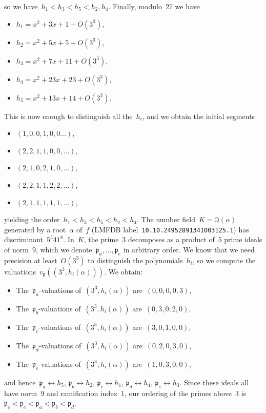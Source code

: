 \documentclass{article}
\def\Q{{\mathbb Q}}
\def\p{{\mathfrak p}}
\begin{document}
so we have~$h_1<h_3<h_5<h_2,h_4$. Finally, modulo~$27$ we have
\begin{itemize}
  \item $h_1 = x^2 + 3x + 1 + O(3^3)$,
  \item $h_2 = x^2 + 5x + 5 + O(3^3)$,
  \item $h_3 = x^2 + 7x + 11 + O(3^3)$,
  \item $h_4 = x^2 + 23x + 23 + O(3^3)$,
  \item $h_5 = x^2 + 13x + 14 + O(3^3)$.
\end{itemize}
This is now enough to distinguish all the~$h_i$, and we obtain the initial segments
\begin{itemize}
  \item $(1,0,0,1,0,0\dots)$,
  \item $(2,2,1,1,0,0,\dots)$,
  \item $(2,1,0,2,1,0,\dots)$,
  \item $(2,2,1,1,2,2,\dots)$,
  \item $(2,1,1,1,1,1,\dots)$,
\end{itemize}
yielding the order~$h_1 < h_3 < h_5 < h_2 < h_4$. The number field~$K =
\Q(\alpha)$ generated by a root~$\alpha$ of~$f$ (LMFDB
label~\texttt{10.10.24952891341003125.1}) has discriminant~$5^5 41^8$.
In~$K$, the prime~$3$ decomposes as a product of~$5$ prime ideals of norm~$9$,
which we denote~$\p_a, \dots, \p_e$ in arbitrary order. We know that we need
precision at least~$O(3^3)$ to distinguish the polynomials~$h_i$, so we compute
the valuations~$v_\p((3^3,h_i(\alpha)))$. We obtain:
\begin{itemize}
  \item The~$\p_a$-valuations of~$(3^3,h_i(\alpha))$ are~$(0,0,0,0,3)$,
  \item The~$\p_b$-valuations of~$(3^3,h_i(\alpha))$ are~$(0,3,0,2,0)$,
  \item The~$\p_c$-valuations of~$(3^3,h_i(\alpha))$ are~$(3,0,1,0,0)$,
  \item The~$\p_d$-valuations of~$(3^3,h_i(\alpha))$ are~$(0,2,0,3,0)$,
  \item The~$\p_e$-valuations of~$(3^3,h_i(\alpha))$ are~$(1,0,3,0,0)$,
\end{itemize}
and hence~$\p_a\leftrightarrow h_5$, $\p_b\leftrightarrow h_2$,
$\p_c\leftrightarrow h_1$, $\p_d\leftrightarrow h_4$, $\p_e\leftrightarrow h_3$.
Since these ideals all have norm~$9$ and ramification index~$1$, our ordering of
the primes above~$3$ is~$\p_c < \p_e < \p_a < \p_b < \p_d$.
\end{document}
